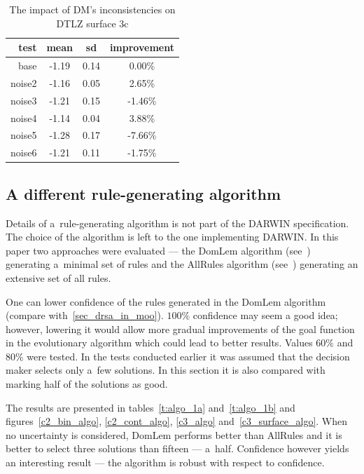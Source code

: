 \begin{table}[h]
  \centering
  \begin{tabular}{r c c c}
    \hline
    test & mean & sd & improvement  \\
    \hline
    \hline
    base & -1.19 & 0.14 & 0.00\%     \\
    noise2 & -1.16 & 0.05 & 2.65\%   \\
    noise3 & -1.21 & 0.15 & -1.46\%  \\
    noise4 & -1.14 & 0.04 & 3.88\%   \\
    noise5 & -1.28 & 0.17 & -7.66\%  \\
    noise6 & -1.21 & 0.11 & -1.75\%  \\
    \hline
  \end{tabular}
  \caption{The impact of DM's inconsistencies on DTLZ surface 3c}
  \label{t:noise3}
\end{table}
\clearpage{}

\subsection{A different rule-generating algorithm}
Details of a~rule-generating algorithm is not part of the DARWIN
specification. The choice of the algorithm is left to the one implementing
DARWIN. In this paper two approaches were evaluated --- the DomLem algorithm
(see~\cite{GMS+01}) generating a~minimal set of rules and the AllRules
algorithm (see~\cite{GMS+01b}) generating an extensive set of all rules.

One can lower confidence of the rules generated in the DomLem algorithm
(compare with~\ref{sec_drsa_in_moo}). $100\%$ confidence may seem a good idea;
however, lowering it would allow more gradual improvements of the goal
function in the evolutionary algorithm which could lead to better
results. Values $60\%$ and $80\%$ were tested. In the tests conducted earlier
it was assumed that the decision maker selects only a~few solutions. In this
section it is also compared with marking half of the solutions as good.

The results are presented in tables~\ref{t:algo_1a} and~\ref{t:algo_1b} and
figures~\ref{c2_bin_algo}, \ref{c2_cont_algo}, \ref{c3_algo}
and~\ref{c3_surface_algo}. When no uncertainty is considered, DomLem performs
better than AllRules and it is better to select three solutions than fifteen
--- a~half. Confidence however yields an interesting result --- the algorithm
is robust with respect to confidence.

